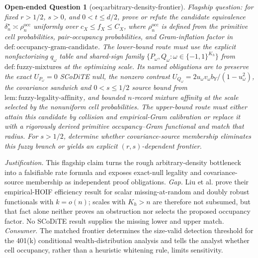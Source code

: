 \documentclass{article}
\newtheorem{openendedquestion}{Open-ended Question}
\begin{document}
\begin{openendedquestion}[oeq:arbitrary-density-frontier]\label{oeq:arbitrary-density-frontier}
Flagship question: for fixed \(r>1/2\), \(s>0\), and \(0<t\le d/2\), prove or refute the candidate equivalence \(\delta_n^\star\asymp\rho_n^{\mathrm{occ}}\) uniformly over \(c_X\le f_X\le C_X\), where \(\rho_n^{\mathrm{occ}}\) is defined from the primitive cell probabilities, pair-occupancy probabilities, and Gram-inflation factor in \(\mathrm{def{:}occupancy\mbox{-}gram\mbox{-}candidate}\). The lower-bound route must use the explicit nonfactorizing \(q_\omega\) table and shared-sign family \(\{P_\omega,Q_\omega:\omega\in\{-1,1\}^{K_h}\}\) from \(\mathrm{def{:}fuzzy\mbox{-}mixtures}\) at the optimizing scale. Its named obligations are to preserve the exact \(U_{P_\omega}=0\) SCoDiTE null, the nonzero contrast \(U_{Q_\omega}=2u_\omega v_\omega b_Y/(1-u_\omega^2)\), the covariance sandwich and \(0<s\le1/2\) source bound from \(\mathrm{lem{:}fuzzy\mbox{-}legality\mbox{-}affinity}\), and bounded \(n\)-record mixture affinity at the scale selected by the nonuniform cell probabilities. The upper-bound route must either attain this candidate by collision and empirical-Gram calibration or replace it with a rigorously derived primitive occupancy--Gram functional and match that radius. For \(s>1/2\), determine whether covariance-source membership eliminates this fuzzy branch or yields an explicit \((r,s)\)-dependent frontier.
\end{openendedquestion}
\par\smallskip\noindent \textit{Justification.} This flagship claim turns the rough arbitrary-density bottleneck into a falsifiable rate formula and exposes exact-null legality and covariance-source membership as independent proof obligations. \textit{Gap.} Liu et al. prove their empirical-HOIF efficiency result for scalar missing-at-random and doubly robust functionals with \(k=o(n)\); scales with \(K_h>n\) are therefore not subsumed, but that fact alone neither proves an obstruction nor selects the proposed occupancy factor. No SCoDiTE result supplies the missing lower and upper match. \textit{Consumer.} The matched frontier determines the size-valid detection threshold for the 401(k) conditional wealth-distribution analysis and tells the analyst whether cell occupancy, rather than a heuristic whitening rule, limits sensitivity.
\end{document}
